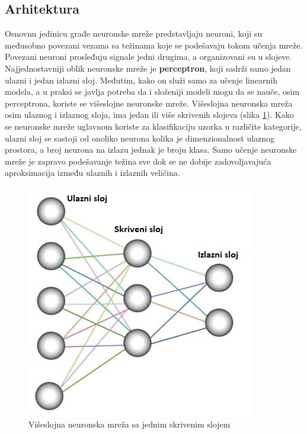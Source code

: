 \documentclass[a4paper]{article}
\begin{document}
\subsection{Arhitektura}

Osnovnu jedinicu građe neuronske mreže predstavljaju neuroni, koji su međusobno povezani vezama sa težinama koje se podešavaju tokom učenja mreže. Povezani neuroni prosleđuju signale jedni drugima, a organizovani su u slojeve. Najjednostavniji oblik neuronske mreže je \textbf{perceptron}, koji sadrži samo jedan ulazni i jedan izlazni sloj. Međutim, kako on služi samo za učenje linearnih modela, a u praksi se javlja potreba da i složeniji modeli mogu da se nauče, osim perceptrona, koriste se višeslojne neuronske mreže. Višeslojna neuronska mreža osim ulaznog i izlaznog sloja, ima jedan ili više skrivenih slojeva (slika \ref{fig:neural_network_layers}).
Kako se neuronske mreže uglavnom koriste za klasifikaciju uzorka u različite kategorije, ulazni sloj se sastoji od onoliko neurona kolika je dimenzionalnost ulaznog prostora, a broj neurona na izlazu jednak je broju klasa. Samo učenje neuronske mreže je zapravo podešavanje težina sve dok se ne dobije zadovoljavajuća aproksimacija između ulaznih i izlaznih veličina.

\begin{figure}[h!]
\begin{center}
\includegraphics[scale=1]{neural_network_layers.jpeg}
\end{center}
\caption{Višeslojna neuronska mreža sa jednim skrivenim slojem}
\label{fig:neural_network_layers}
\end{figure}
\end{document}
